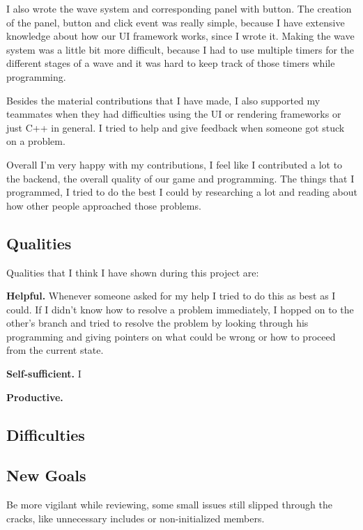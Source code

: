 I also wrote the wave system and corresponding panel with button. 
The creation of the panel, button and click event was really simple, because 
I have extensive knowledge about how our UI framework works, since I wrote it.
Making the wave system was a little bit more difficult, because I had to use 
multiple timers for the different stages of a wave and it was hard to keep 
track of those timers while programming.

Besides the material contributions that I have made, I also supported my 
teammates when they had difficulties using the UI or rendering frameworks or 
just C++ in general. I tried to help and give feedback when someone got 
stuck on a problem.

Overall I'm very happy with my contributions, I feel like I contributed a lot 
to the backend, the overall quality of our game and programming. The things 
that I programmed, I tried to do the best I could by researching a lot and 
reading about how other people approached those problems.

\subsection{Qualities}
Qualities that I think I have shown during this project are:

\textbf{Helpful.} Whenever someone asked for my help I tried to do this as best 
as I could. If I didn't know how to resolve a problem immediately, I hopped on to 
the other's branch and tried to resolve the problem by looking through his 
programming and giving pointers on what could be wrong or how to proceed from 
the current state.

\textbf{Self-sufficient.} I 

\textbf{Productive.}

\subsection{Difficulties}
\subsection{New Goals}
Be more vigilant while reviewing, some small issues still slipped through 
the cracks, like unnecessary includes or non-initialized members.

